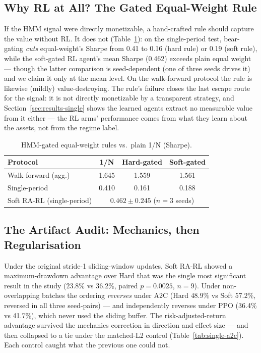 \documentclass[sigconf,anonymous,review]{acmart}
\begin{document}
\subsection{Why RL at All? The Gated Equal-Weight Rule}
\label{sec:results-gatedew}

If the HMM signal were directly monetizable, a hand-crafted rule should
capture the value without RL. It does not (Table~\ref{tab:gatedew}): on
the single-period test, bear-gating \emph{cuts} equal-weight's Sharpe
from 0.41 to 0.16 (hard rule) or 0.19 (soft rule), while the soft-gated
RL agent's mean Sharpe (0.462) exceeds plain equal weight --- though the
latter comparison is seed-dependent (one of three seeds drives it) and
we claim it only at the mean level. On the walk-forward protocol the
rule is likewise (mildly) value-destroying. The rule's failure closes
the last escape route for the signal: it is not directly monetizable by
a transparent strategy, and Section~\ref{sec:results-single} shows the
learned agents extract no measurable value from it either --- the RL
arms' performance comes from what they learn about the assets, not from
the regime label.

\begin{table}[t]
\caption{HMM-gated equal-weight rules vs.\ plain 1/N (Sharpe).}
\label{tab:gatedew}
\begin{tabular}{lccc}
\toprule
Protocol & 1/N & Hard-gated & Soft-gated \\
\midrule
Walk-forward (agg.) & 1.645 & 1.559 & 1.561 \\
Single-period       & 0.410 & 0.161 & 0.188 \\
\midrule
Soft RA-RL (single-period) & \multicolumn{3}{c}{$0.462 \pm 0.245$ ($n{=}3$ seeds)} \\
\bottomrule
\end{tabular}
\end{table}

\subsection{The Artifact Audit: Mechanics, then Regularisation}
\label{sec:results-mechanics}

Under the original stride-1 sliding-window updates, Soft RA-RL showed a
maximum-drawdown advantage over Hard that was the single most
significant result in the study (23.8\% vs 36.2\%, paired
$p{=}0.0025$, $n{=}9$). Under non-overlapping batches the ordering
\emph{reverses} under A2C (Hard $48.9\%$ vs Soft $57.2\%$, reversed in
all three seed-pairs) --- and independently reverses under PPO (36.4\%
vs 41.7\%), which never used the sliding buffer. The
risk-adjusted-return advantage survived the mechanics correction in
direction and effect size --- and then collapsed to a tie under the
matched-L2 control (Table~\ref{tab:single-a2c}). Each control caught
what the previous one could not.
\end{document}
